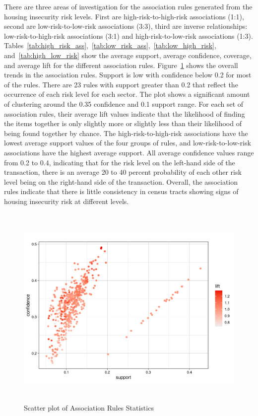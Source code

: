 There are three areas of investigation for the association rules generated from the housing insecurity risk levels. First are high-risk-to-high-risk associations (1:1), second are low-risk-to-low-risk associations (3:3), third are inverse relationships: low-risk-to-high-risk associations (3:1) and high-risk-to-low-risk associations (1:3). Tables~\ref{tab:high_risk_ass},~\ref{tab:low_risk_ass},~\ref{tab:low_high_risk}, and~\ref{tab:high_low_risk} show the average support, average confidence, coverage, and average lift for the different association rules. Figure~\ref{fig:assoc_scatter} shows the overall trends in the association rules. Support is low with confidence below 0.2 for most of the rules.  There are 23 rules with support greater than 0.2 that reflect the occurrence of each risk level for each sector. The plot shows a significant amount of clustering around the 0.35 confidence and 0.1 support range. For each set of association rules, their average lift values indicate that the likelihood of finding the items together is only slightly more or slightly less than their likelihood of being found together by chance. The high-risk-to-high-risk associations have the lowest average support values of the four groups of rules, and low-risk-to-low-risk associations have the highest average support. All average confidence values range from 0.2 to 0.4, indicating that for the risk level on the left-hand side of the transaction, there is an average 20 to 40 percent probability of each other risk level being on the right-hand side of the transaction. Overall, the association rules indicate that there is little consistency in census tracts showing signs of housing insecurity risk at different levels. 


 \begin{figure}[htbp]
    \centering
     \includegraphics[width=1\textwidth, height=10cm]{plots/assoc_scatter.png}
     \caption{Scatter plot of Association Rules Statistics}
     \label{fig:assoc_scatter}
 \end{figure}

